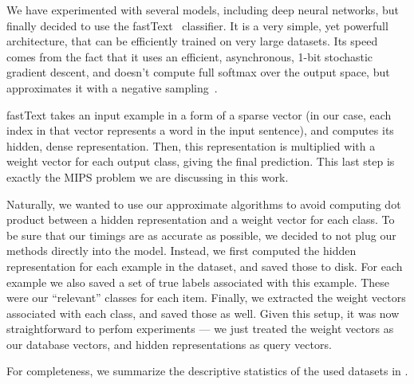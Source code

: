         We have experimented with several models, including deep neural networks, but finally decided to
        use the fastText~\cite{fasttext} classifier. It is a very simple, yet powerfull architecture, that
        can be efficiently trained on very large datasets. Its speed comes from the fact that it uses an efficient,
        asynchronous, 1-bit stochastic gradient descent, and doesn't compute full softmax over the output space,
        but approximates it with a negative sampling~\cite{w2v}.

        fastText takes an input example in a form of a sparse vector (in our case, each index in that vector
        represents a word in the input sentence), and computes its hidden, dense representation. Then, this
        representation is multiplied with a weight vector for each output class, giving the final prediction.
        This last step is exactly the MIPS problem we are discussing in this work. 

        Naturally, we wanted to use our approximate algorithms to avoid computing dot product between a hidden
        representation and a weight vector for each class. To be sure that our timings are as accurate as possible,
        we decided to not plug our methods directly into the model. Instead, we first computed the hidden representation
        for each example in the dataset, and saved those to disk. For each example we also saved a set of
        true labels associated with this example. These were our ``relevant'' classes for each item.
        Finally, we extracted the weight vectors associated with each class, and saved those as well. Given this setup,
        it was now straightforward to perfom experiments --- we just treated the weight vectors as our database vectors,
        and hidden representations as query vectors.

        For completeness, we summarize the descriptive statistics of the used datasets in .

